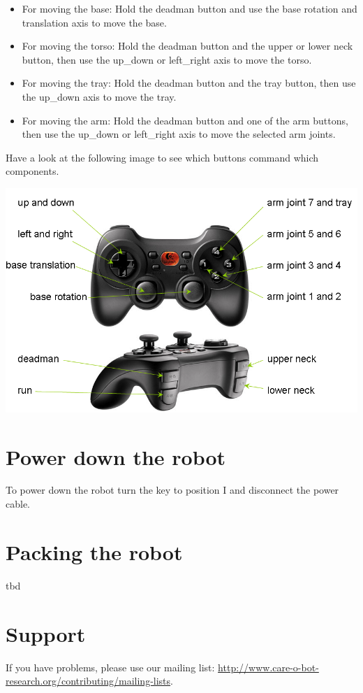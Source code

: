 \begin{itemize}
\item For moving the base: Hold the deadman button and use the base rotation and translation axis to move the base.
\item For moving the torso: Hold the deadman button and the upper or lower neck button, then use the up\_down or left\_right axis to move the torso.
\item For moving the tray: Hold the deadman button and the tray button, then use the up\_down axis to move the tray.
\item For moving the arm: Hold the deadman button and one of the arm buttons, then use the up\_down or left\_right axis to move the selected arm joints.
\end{itemize}

Have a look at the following image to see which buttons command which components. 
\begin{center}
\includegraphics[width=1\textwidth]{images/joystick.png}
\end{center}

\section{Power down the robot}
To power down the robot turn the key to position I and disconnect the power cable.

\section{Packing the robot}
tbd

\section{Support}
If you have problems, please use our mailing list: \url{http://www.care-o-bot-research.org/contributing/mailing-lists}.